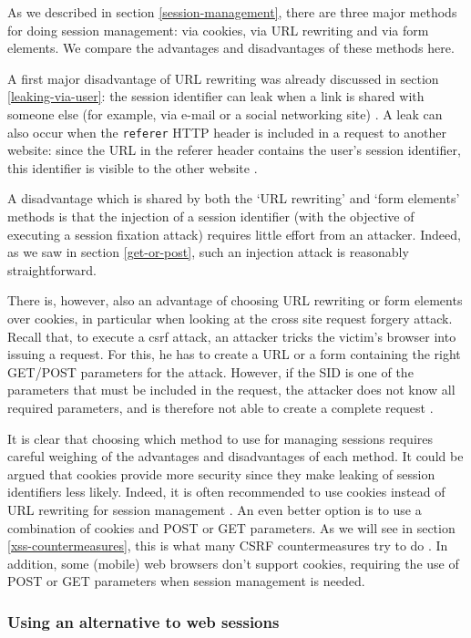 As we described in section \ref{session-management}, there are three major methods for doing session management: via cookies, via URL rewriting and via form elements. We compare the advantages and disadvantages of these methods here.

A first major disadvantage of URL rewriting was already discussed in section \ref{leaking-via-user}: the session identifier can leak when a link is shared with someone else (for example, via e-mail or a social networking site) \cite{Johnston2004}. A leak can also occur when the \texttt{referer} HTTP header is included in a request to another website: since the URL in the referer header contains the user's session identifier, this identifier is visible to the other website \cite{Fu2001}.

A disadvantage which is shared by both the `URL rewriting' and `form elements' methods is that the injection of a session identifier (with the objective of executing a session fixation attack) requires little effort from an attacker. Indeed, as we saw in section \ref{get-or-post}, such an injection attack is reasonably straightforward.

There is, however, also an advantage of choosing URL rewriting or form elements over cookies, in particular when looking at the cross site request forgery attack. Recall that, to execute a \gls{csrf} attack, an attacker tricks the victim's browser into issuing a request. For this, he  has to create a URL or a form containing the right GET/POST parameters for the attack. However, if the SID is one of the parameters that must be included in the request, the attacker does not know all required parameters, and is therefore not able to create a complete request \cite{Johnston2004}.

It is clear that choosing which method to use for managing sessions requires careful weighing of the advantages and disadvantages of each method. It could be argued that cookies provide more security since they make leaking of session identifiers less likely. Indeed, it is often recommended to use cookies instead of URL rewriting for session management \cite{Zhong2006,Vamosi2006}. An even better option is to use a combination of cookies and POST or GET parameters. As we will see in section \ref{xss-countermeasures}, this is what many CSRF countermeasures try to do \cite{Jovanovic2006,Johns2006}. In addition, some (mobile) web browsers don't support cookies, requiring the use of POST or GET parameters when session management is needed.

\subsubsection{Using an alternative to web sessions}


